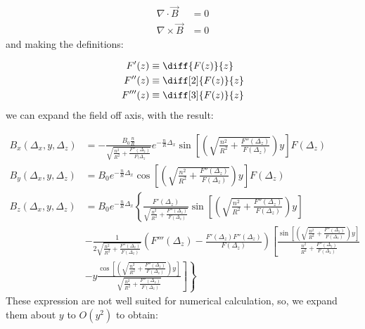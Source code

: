 \begin{align*}
\nabla \cdot \overrightarrow{B} &= 0 \\
\nabla \times \overrightarrow{B} &= 0
\end{align*}
and making the definitions:

\begin{align*}
F'(z) &\equiv \diff{F(z)}{z} \\
F''(z) &\equiv \diff[2]{F(z)}{z} \\
F'''(z) &\equiv \diff[3]{F(z)}{z}
\end{align*}
we can expand the field off axis, with the result:

\begin{align*}
B_x(\Delta_x, y, \Delta_z) &= -\frac{B_0 \frac{n}{R}}{\sqrt{\frac{n^2}{R^2} +  \frac{F''(\Delta_z)}{F(\Delta_z}}} e^{-\frac{n}{R} \Delta_x} \sin \left[ \left( \sqrt{\frac{n^2}{R^2} + \frac{F''(\Delta_z)}{F(\Delta_z)}} \right) y \right] F(\Delta_z) \\
B_y(\Delta_x, y, \Delta_z) &= B_0 e^{-\frac{n}{R} \Delta_x} \cos \left[ \left( \sqrt{\frac{n^2}{R^2} + \frac{F''(\Delta_z)}{F(\Delta_z)}} \right) y \right] F(\Delta_z) \\
B_z(\Delta_x, y, \Delta_z) &= B_0 e^{-\frac{n}{R} \Delta_x} \left\{\frac{F'(\Delta_z)}{\sqrt{\frac{n^2}{R^2} + \frac{F''(\Delta_z)}{F(\Delta_z)}}} \sin \left[ \left( \sqrt{\frac{n^2}{R^2} + \frac{F''(\Delta_z)}{F(\Delta_z)}} \right) y \right] \right. \\
&- \frac{1}{2 \sqrt{\frac{n^2}{R^2} + \frac{F''(\Delta_z)}{F(\Delta_z)}}} \left(F'''(\Delta_z) - \frac{F'(\Delta_z) F''(\Delta_z)}{F(\Delta_z)} \right) \left[ \frac{\sin \left[ \left( \sqrt{\frac{n^2}{R^2} + \frac{F''(\Delta_z)}{F(\Delta_z)}} \right) y \right]}{\frac{n^2}{R^2} + \frac{F''(\Delta_z)}{F(\Delta_z)}} \right. \\
&- \left. \left. y \frac{\cos \left[ \left( \sqrt{\frac{n^2}{R^2} + \frac{F''(\Delta_z)}{F(\Delta_z)}} \right) y \right]}{\sqrt{\frac{n^2}{R^2} + \frac{F''(\Delta_z)}{F(\Delta_z)}}} \right] \right\}
\end{align*}
These expression are not well suited for numerical calculation, so, we expand them about $y$ to $O(y^2)$ to obtain:

